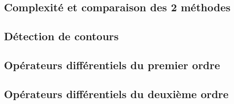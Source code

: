 \documentclass[a4,12pt]{article}
\begin{document}
\subsection{Complexité et comparaison des 2 méthodes}

\begin{shaded}
\end{shaded}

\begin{mdframed}[style=exampledefault]
    \section{Détection de contours}
\end{mdframed}

\subsection{Opérateurs différentiels du premier ordre}

\begin{shaded}
\end{shaded}

\subsection{Opérateurs différentiels du deuxième ordre}

\begin{shaded}
\end{shaded}
\end{document}
